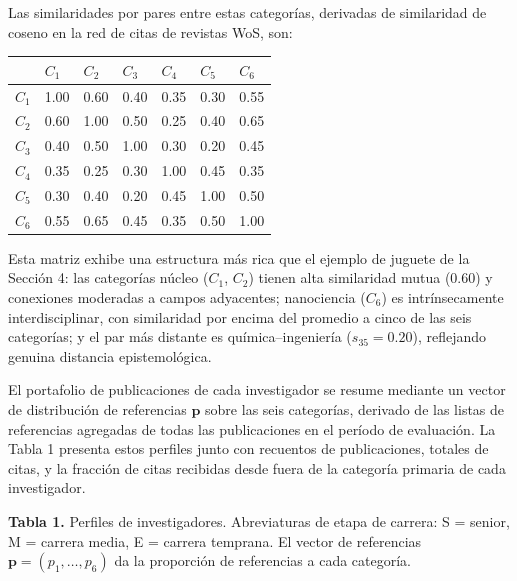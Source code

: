 \documentclass[
]{article}
\begin{document}
Las similaridades por pares entre estas categorías, derivadas de
similaridad de coseno en la red de citas de revistas WoS, son:

\begin{longtable}[]{@{}lllllll@{}}
\toprule
& \(C_1\) & \(C_2\) & \(C_3\) & \(C_4\) & \(C_5\) & \(C_6\) \\
\midrule
\endhead
\(C_1\) & 1.00 & 0.60 & 0.40 & 0.35 & 0.30 & 0.55 \\
\(C_2\) & 0.60 & 1.00 & 0.50 & 0.25 & 0.40 & 0.65 \\
\(C_3\) & 0.40 & 0.50 & 1.00 & 0.30 & 0.20 & 0.45 \\
\(C_4\) & 0.35 & 0.25 & 0.30 & 1.00 & 0.45 & 0.35 \\
\(C_5\) & 0.30 & 0.40 & 0.20 & 0.45 & 1.00 & 0.50 \\
\(C_6\) & 0.55 & 0.65 & 0.45 & 0.35 & 0.50 & 1.00 \\
\bottomrule
\end{longtable}

Esta matriz exhibe una estructura más rica que el ejemplo de juguete de
la Sección 4: las categorías núcleo (\(C_1\), \(C_2\)) tienen alta
similaridad mutua (0.60) y conexiones moderadas a campos adyacentes;
nanociencia (\(C_6\)) es intrínsecamente interdisciplinar, con
similaridad por encima del promedio a cinco de las seis categorías; y el
par más distante es química--ingeniería (\(s_{35} = 0.20\)), reflejando
genuina distancia epistemológica.

El portafolio de publicaciones de cada investigador se resume mediante
un vector de distribución de referencias \(\mathbf{p}\) sobre las seis
categorías, derivado de las listas de referencias agregadas de todas las
publicaciones en el período de evaluación. La Tabla 1 presenta estos
perfiles junto con recuentos de publicaciones, totales de citas, y la
fracción de citas recibidas desde fuera de la categoría primaria de cada
investigador.

\textbf{Tabla 1.} Perfiles de investigadores. Abreviaturas de etapa de
carrera: S = senior, M = carrera media, E = carrera temprana. El vector
de referencias \(\mathbf{p} = (p_1, \ldots, p_6)\) da la proporción de
referencias a cada categoría.
\end{document}
